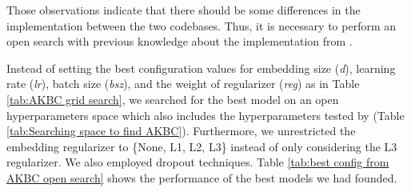 Those observations indicate that there should be some differences in the implementation between the two codebases. Thus, it is necessary to perform an open search with previous knowledge about the implementation from \citet{chen2021relation}. 

\begin{table}[!htbp]
\centering
{}
\caption{Searching space to find AKBC}
\label{tab:Searching space to find AKBC}
\end{table}


Instead of setting the best configuration values for embedding size (\textit{d}), learning rate (\textit{lr}), batch size (\textit{bsz}), and the weight of regularizer (\textit{reg}) as in Table \ref{tab:AKBC grid search}, we searched for the best model on an open hyperparameters space which also includes the hyperparameters tested by \citet{chen2021relation} (Table \ref{tab:Searching space to find AKBC}). Furthermore, we unrestricted the embedding regularizer to \{None, L1, L2, L3\} instead of only considering the L3 regularizer. We also employed dropout techniques. Table \ref{tab:best config from AKBC open search} shows the performance of the best models we had founded.

